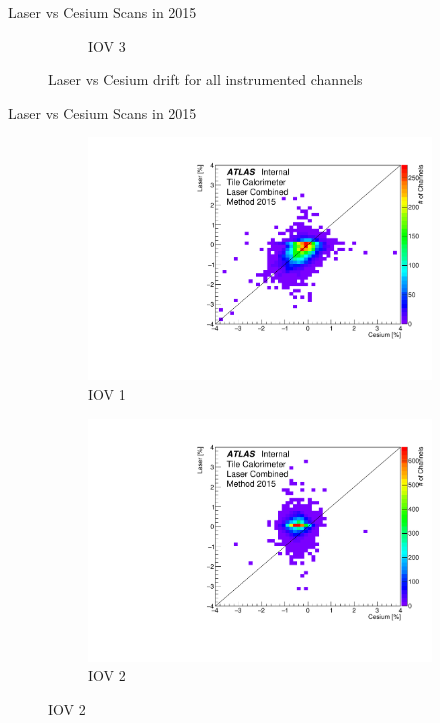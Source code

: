 \documentclass{beamer}
\begin{document}
\begin{frame}{Laser vs Cesium Scans in 2015}
\begin{figure}[H]
\begin{subfigure} [t] {0.3\textwidth}
\caption{IOV 3}
\end{subfigure}
\caption{Laser vs Cesium drift for all instrumented channels}
\end{figure}
\end{frame}

\begin{frame}{Laser vs Cesium Scans in 2015}
    \begin{figure}[H]
\centering
\begin{subfigure} [t] {0.3\textwidth}
\includegraphics[width=\textwidth]{colz_iov1.pdf}
\caption{IOV 1}
\end{subfigure}
\begin{subfigure} [t] {0.3\textwidth}
\includegraphics[width=\textwidth]{colz_iov2.pdf}
\caption{IOV 2}
\end{subfigure}

\end{figure}
\end{frame}
\end{document}
